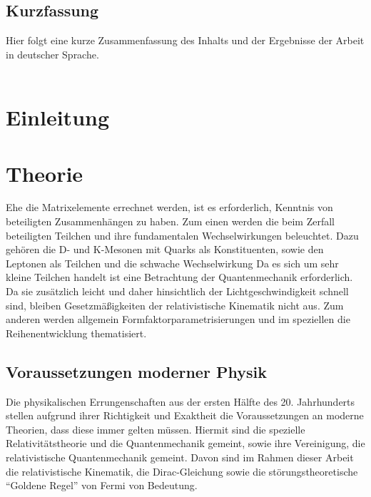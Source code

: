 \documentclass[11pt,a4paper,twoside]{report}
\begin{document}
\thispagestyle{empty}
\section*{Kurzfassung}
Hier folgt eine kurze Zusammenfassung des Inhalts und der Ergebnisse der Arbeit in deutscher Sprache.\\
\ \\

\newpage


\tableofcontents\newpage
{}
\listoffigures\newpage
{}
\listoftables\newpage

\setcounter{page}{0}

\chapter{Einleitung}


\chapter{Theorie}
Ehe die Matrixelemente errechnet werden, ist es erforderlich, Kenntnis von beteiligten Zusammenhängen zu haben. Zum einen werden die beim Zerfall beteiligten
Teilchen und ihre fundamentalen Wechselwirkungen beleuchtet. Dazu gehören die D- und K-Mesonen mit Quarks als Konstituenten, sowie den Leptonen als Teilchen
und die schwache Wechselwirkung 
Da es sich um sehr kleine Teilchen handelt ist eine Betrachtung der Quantenmechanik erforderlich. 
Da sie zusätzlich leicht und daher hinsichtlich der Lichtgeschwindigkeit schnell sind, bleiben Gesetzmäßigkeiten der relativistische Kinematik nicht aus.
Zum anderen werden allgemein Formfaktorparametrisierungen und im speziellen die Reihenentwicklung thematisiert.
\section{Voraussetzungen moderner Physik}
Die physikalischen Errungenschaften aus der ersten Hälfte des 20. Jahrhunderts stellen aufgrund ihrer Richtigkeit und Exaktheit die Voraussetzungen an moderne 
Theorien, dass diese immer gelten müssen. Hiermit sind die spezielle Relativitätstheorie und die Quantenmechanik gemeint, sowie ihre Vereinigung, die relativistische
Quantenmechanik gemeint. Davon sind im Rahmen dieser Arbeit die relativistische Kinematik, die Dirac-Gleichung sowie die störungstheoretische ``Goldene Regel'' von Fermi
von Bedeutung.
\end{document}
